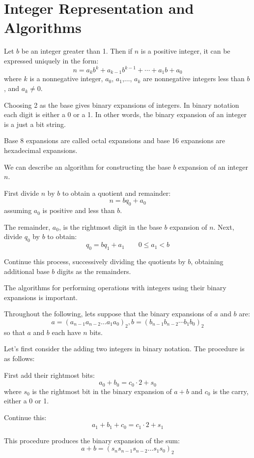 \documentclass[../discrete.tex]{subfiles}
\begin{document}
\section{Integer Representation and Algorithms}
\begin{theorem}
    Let $b$ be an integer greater than 1. Then if $n$ is a positive integer, it can be expressed uniquely in the form:
    \[n=a_kb^k+a_{k-1}b^{k-1}+\cdots+a_1b+a_0\]
    where $k$ is a nonnegative integer, $a_0$, $a_1$,$\dots$, $a_k$ are nonnegative integers less than $b$, and $a_k\neq 0$.
\end{theorem}

Choosing 2 as the base gives binary expansions of integers. In binary notation each digit is either a 0 or a 1.
In other words, the binary expansion of an integer is a just a bit string.

Base 8 expansions are called octal expansions and base 16 expansions are hexadecimal expansions.

We can describe an algorithm for constructing the base $b$ expansion of an integer $n$.

First divide $n$ by $b$ to obtain a quotient and remainder:
\[n=bq_0+a_0\] 
assuming $a_0$ is positive and less than $b$.

The remainder, $a_0$, is the rightmost digit in the base $b$ expansion of $n$. Next, divide $q_0$ by $b$ to obtain:
\[q_0=bq_1+a_1 \qquad 0\leq a_1<b\]

Continue this process, successively dividing the quotients by $b$, obtaining additional base $b$ digits as the remainders.

The algorithms for performing operations with integers using their binary expansions is important.

Throughout the following, lets suppose that the binary expansions of $a$ and $b$ are:
\[a = (a_{n-1}a_{n-2}\dots a_1a_0)_2, b=(b_{n-1}b_{n-2}\cdots b_1b_0)_2\]
so that $a$ and $b$ each have $n$ bits.

Let's first consider the adding two integers in binary notation. The procedure is as follows:

First add their rightmost bits:
\[a_0+b_0=c_0\cdot 2+s_0\]
where $s_0$ is the rightmost bit in the binary expansion of $a+b$ and $c_0$ is the carry, either a 0 or 1.

Continue this:
\[a_1+b_1+c_0=c_1\cdot2 +s_1\]

This procedure produces the binary expansion of the sum:
\[a+b=(s_ns_{n-1}s_{n-2}\dots s_1s_0)_2\]
\end{document}
